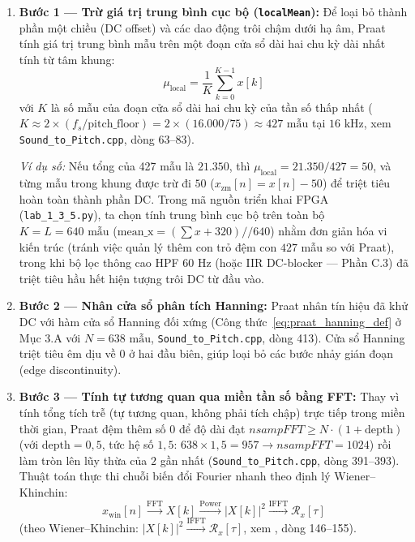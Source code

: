 \documentclass[11pt,a4paper]{article}
\begin{document}
\begin{enumerate}
    \setlength{\itemsep}{2pt}
    \item \textbf{Bước 1 --- Trừ giá trị trung bình cục bộ (\texttt{localMean}):}
    Để loại bỏ thành phần một chiều (DC offset) và các dao động trôi chậm dưới hạ âm, Praat tính giá trị trung bình mẫu trên một đoạn cửa sổ dài hai chu kỳ dài nhất tính từ tâm khung:
    \[
    \mu_{\text{local}} = \frac{1}{K} \sum_{k=0}^{K-1} x[k]
    \]
    với $K$ là số mẫu của đoạn cửa sổ dài hai chu kỳ của tần số thấp nhất ($K \approx 2 \times (f_s / \text{pitch\_floor}) = 2 \times (16.000 / 75) \approx 427\text{ mẫu}$ tại $16\text{ kHz}$, xem \texttt{Sound\_to\_Pitch.cpp}, dòng 63--83).
    
    \textit{Ví dụ số:} Nếu tổng của 427 mẫu là $21.350$, thì $\mu_{\text{local}} = 21.350 / 427 = 50$, và từng mẫu trong khung được trừ đi $50$ ($x_{\text{zm}}[n] = x[n] - 50$) để triệt tiêu hoàn toàn thành phần DC. Trong mã nguồn triển khai FPGA (\texttt{lab\_1\_3\_5.py}), ta chọn tính trung bình cục bộ trên toàn bộ $K = L = 640\text{ mẫu}$ ($\text{mean\_x} = (\sum x + 320) // 640$) nhằm đơn giản hóa vi kiến trúc (tránh việc quản lý thêm con trỏ đệm con $427$ mẫu so với Praat), trong khi bộ lọc thông cao HPF $60\text{ Hz}$ (hoặc IIR DC-blocker --- Phần C.3) đã triệt tiêu hầu hết hiện tượng trôi DC từ đầu vào.
    \item \textbf{Bước 2 --- Nhân cửa sổ phân tích Hanning:}
    Praat nhân tín hiệu đã khử DC với hàm cửa sổ Hanning đối xứng (Công thức~\eqref{eq:praat_hanning_def} ở Mục 3.A với $N = 638\text{ mẫu}$, \texttt{Sound\_to\_Pitch.cpp}, dòng 413). Cửa sổ Hanning triệt tiêu êm dịu về $0$ ở hai đầu biên, giúp loại bỏ các bước nhảy gián đoạn (edge discontinuity).
    \item \textbf{Bước 3 --- Tính tự tương quan qua miền tần số bằng FFT:}
    Thay vì tính tổng tích trễ (tự tương quan, không phải tích chập) trực tiếp trong miền thời gian, Praat đệm thêm số $0$ để độ dài đạt $nsampFFT \ge N \cdot (1 + \text{depth})$ (với $\text{depth} = 0{,}5$, tức hệ số $1{,}5$: $638 \times 1{,}5 = 957 \to nsampFFT = 1024$) rồi làm tròn lên lũy thừa của $2$ gần nhất (\texttt{Sound\_to\_Pitch.cpp}, dòng 391--393). Thuật toán thực thi chuỗi biến đổi Fourier nhanh theo định lý Wiener--Khinchin:
    \[
    x_{\text{win}}[n] \xrightarrow{\text{FFT}} X[k] \xrightarrow{\text{Power}} |X[k]|^2 \xrightarrow{\text{IFFT}} \mathcal{R}_x[\tau]
    \]
    (theo Wiener--Khinchin: $|X[k]|^2 \xrightarrow{\text{IFFT}} \mathcal{R}_x[\tau]$, xem , dòng 146--155).


\end{enumerate}
\end{document}
